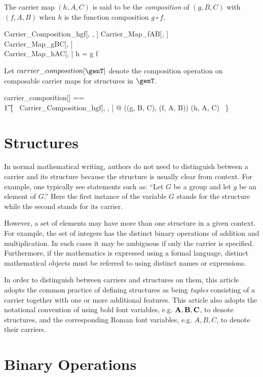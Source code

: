 \documentclass{amsart}
\begin{document}
The carrier map $(h, A, C)$ is said to be the \textit{composition} of $(g, B, C)$ with $(f, A, B)$ when
$h$ is the function composition $g \circ f$.
\begin{schema}{Carrier\_Composition\_hgf}[\genT, \genU, \genV]
	Carrier\_Map\_fAB[\genT, \genU] \\
	Carrier\_Map\_gBC[\genU, \genV] \\
	Carrier\_Map\_hAC[\genT, \genV]
\where
	h = g \circ f
\end{schema}

Let $carrier\_composition[\genT]$ denote the composition operation on composable carrier maps
for structures in $\genT$.
\begin{zed}
	carrier\_composition[\genT] == \\
	\t1	\{~ Carrier\_Composition\_hgf[\genT, \genT, \genT] @ ((g, B, C), (f, A, B)) \mapsto (h, A, C) ~\}
\end{zed}

\section{Structures}

In normal mathematical writing, authors do not need to distinguish between a carrier and its structure
because the structure is usually clear from context.
For example, one typically see statements such as:  
``Let $G$ be a group and let $g$ be an element of $G$.''
Here the first instance of the variable $G$ stands for the structure while the second stands for its carrier.

However, a set of elements may have more than one structure in a given context.
For example, the set of integers has the distinct binary operations of addition and multiplication.
In such cases it may be ambiguous if only the carrier is specified.
Furthermore, if the mathematics is expressed using a formal language, distinct mathematical objects
must be referred to using distinct names or expressions.

In order to distinguish between carriers and structures on them, 
this article adopts the common practice of defining structures as being \textit{tuples}
consisting of a carrier together with one or more additional features.
This article also adopts the notational convention of using bold font variables, e.g. $\mathbf{A}, \mathbf{B}, \mathbf{C}$,
to denote structures, and the corresponding Roman font variables, e.g. $A, B, C$, to denote their carriers.

\section{Binary Operations}
\end{document}
